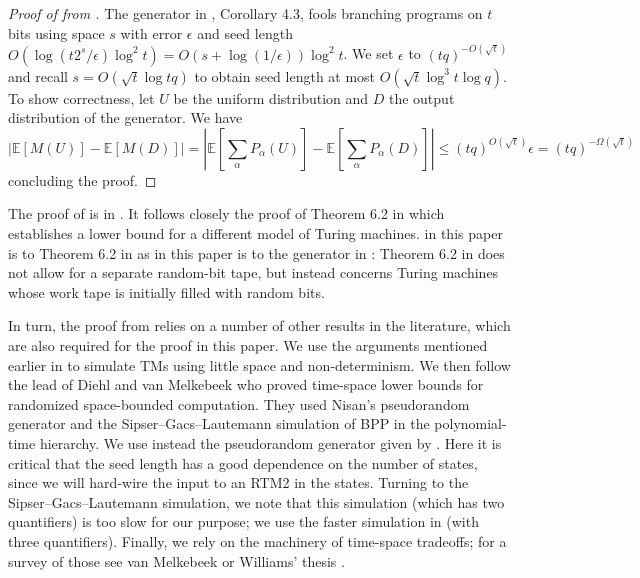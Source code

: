\documentclass{toc}
\newcommand{\E}{\mathbb{E}}
\newcommand{\eps}{\epsilon}
\begin{document}
%
%
%
%
%
%
%
\begin{proof}[Proof of  from
  ]  %
The generator in \cite{ForbesKelley-2018}, Corollary 4.3, fools branching
programs on $t$ bits using space $s$ with error $\eps$ and seed length
$O(\log(t2^{s}/\eps)\log^{2}t)=O(s+\log(1/\eps))\log^{2}t$. We set $\eps$
to $(tq)^{-O(\sqrt{t})}$ and recall $s=O(\sqrt{t}\log tq)$ to obtain
seed length at most $O(\sqrt{t}\log^{3}t\log q)$. To show correctness,
let $U$ be the uniform distribution and $D$ the output distribution
of the generator. We have
%
%
\[
\left|\E[M(U)]-\E[M(D)]\right|=
\left|\E\left[\sum_{\alpha}P_{\alpha}(U)\right]-
\E\left[\sum_{\alpha}P_{\alpha}(D)\right]\right|\le(tq)^{O(\sqrt{t})}\eps
%
=(tq)^{-\Omega(\sqrt{t})}   %
\]
concluding the proof.
%
%
%
%
\end{proof}
%
The proof of  is in .
It follows closely the proof of Theorem 6.2 in \cite{ViolaBPvsE}
which establishes a lower bound for a different model of Turing machines.
 in this paper is to Theorem 6.2 in \cite{ViolaBPvsE}
as  in this paper is to the generator in \cite{INW94}:
Theorem 6.2 in \cite{ViolaBPvsE} does not allow for a separate random-bit
tape, but instead concerns Turing machines whose work tape is initially
filled with random bits.

In turn, the proof from \cite{ViolaBPvsE} relies on a number of other
results in the literature, which are also required for the proof in
this paper. We use the arguments mentioned earlier in \cite{MaS87,DBLP:journals/tcs/MelkebeekR05}
to simulate TMs using little space and non-determinism. We then follow
the lead of Diehl and van Melkebeek \cite{DvM06} who proved time-space
lower bounds for randomized space-bounded computation. They used Nisan's
pseudorandom generator \cite{Nis92} and the Sipser--Gacs--Lautemann
\cite{Sip83b,Lau83} simulation of BPP in the polynomial-time hierarchy.
We use instead the pseudorandom generator given by .
Here it is critical that the seed length has a good dependence on
the number of states, since we will hard-wire the input to an RTM2
in the states. Turning to the Sipser--Gacs--Lautemann simulation, we
note that this simulation (which has two quantifiers) is too slow
for our purpose; we use the faster simulation in \cite{ViolaBPvsE}
(with three quantifiers). Finally, we rely on the machinery of time-space
tradeoffs; for a survey of those see van Melkebeek \cite{Melkebeek06}
or Williams' thesis \cite{Williams07}.
\end{document}
